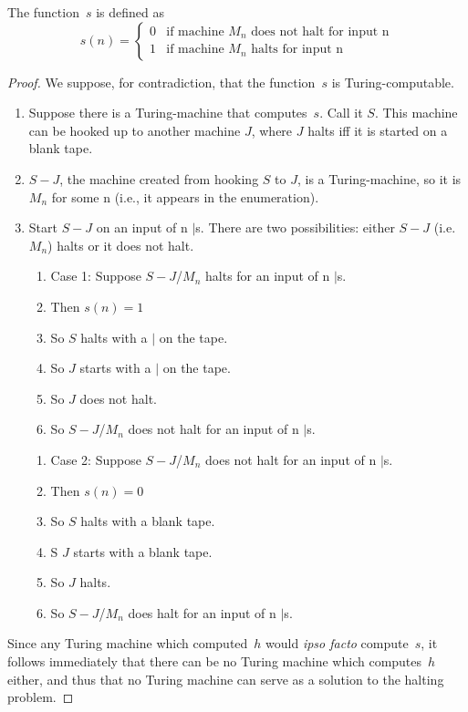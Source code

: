 \documentclass[../../include/open-logic-section]{subfiles}
\begin{document}
\begin{defn} The function~$s$ is defined as
\[
s(n) =
\begin{cases}
  \text{0} & \text{if machine~$M_n$ does not halt for input n} \\
  \text{1} & \text{if machine~$M_n$ halts for input n}
\end{cases}
\]
\end{defn}

\begin{proof}
We suppose, for contradiction, that the function~$s$ is Turing-computable.
\begin{enumerate}
	\item Suppose there is a Turing-machine that computes~$s$. Call it $S$. This machine can be hooked up to another machine $J$, where $J$ halts iff it is started on a blank tape.
	\item $S-J$, the machine created from hooking $S$ to $J$, is a Turing-machine, so it is $M_n$ for some n (i.e., it appears in the enumeration).
	\item Start $S-J$ on an input of n $\mid$s. There are two possibilities: either $S-J$ (i.e. $M_n$) halts or it does not halt.
\begin{enumerate}
	\item Case 1: Suppose $S-J$/$M_n$ halts for an input of n $\mid$s.
	\item Then $s(n) = 1$
	\item So $S$ halts with a $\mid$ on the tape.
	\item So $J$ starts with a $\mid$ on the tape.
	\item So $J$ does not halt.
	\item So $S-J$/$M_n$ does not halt for an input of n $\mid$s.
\end{enumerate}
\begin{enumerate}
	\item Case 2: Suppose $S-J$/$M_n$ does not halt for an input of n $\mid$s.
	\item Then $s(n) = 0$
	\item So $S$ halts with a blank tape.
	\item S $J$ starts with a blank tape.
	\item So $J$ halts.
	\item So $S-J$/$M_n$ does halt for an input of n $\mid$s.
\end{enumerate}
\end{enumerate}

Since any Turing machine which computed~$h$ would \emph{ipso facto} compute~$s$, it follows immediately that there can be no Turing machine which computes~$h$ either, and thus that no Turing machine can serve as a solution to the halting problem.
\end{proof}
\end{document}
